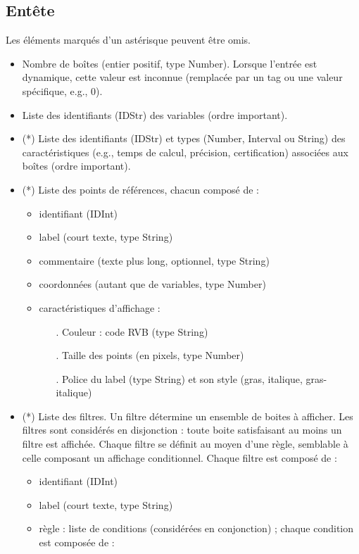 \documentclass[a4paper]{article}
\begin{document}
\subsection{Entête}\label{sec:entree:entete}
Les éléments marqués d'un astérisque peuvent être omis.
\begin{itemize}
\item Nombre de boîtes (entier positif, type Number). Lorsque l'entrée est dynamique, cette valeur est inconnue (remplacée par un tag ou une valeur spécifique, e.g., 0).
\item Liste des identifiants (IDStr) des variables (ordre important).
\item (*) Liste des identifiants (IDStr) et types (Number, Interval ou String) des caractéristiques (e.g., temps de calcul, précision, certification) associées aux boîtes (ordre important).
\item (*) Liste des points de références, chacun composé de :
  \begin{itemize}
  \item identifiant (IDInt)
  \item label (court texte, type String)
  \item commentaire (texte plus long, optionnel, type String)
  \item coordonnées (autant que de variables, type Number)
  \item caractéristiques d'affichage :
    \begin{itemize}
    \item[.] Couleur : code RVB (type String)
    \item[.] Taille des points (en pixels, type Number)
    \item[.] Police du label (type String) et son style (gras, italique, gras-italique)
    \end{itemize}
  \end{itemize}
\item (*) Liste des filtres. Un filtre détermine un ensemble de boites à afficher. Les filtres sont considérés en disjonction : toute boite satisfaisant au moins un filtre est affichée. Chaque filtre se définit au moyen d'une règle, semblable à celle composant un affichage conditionnel. Chaque filtre est composé de :
  \begin{itemize}
  \item identifiant (IDInt)
  \item label (court texte, type String)
  \item règle : liste de conditions (considérées en conjonction) ; chaque condition est composée de :

\end{itemize}
\end{itemize}
\end{document}
